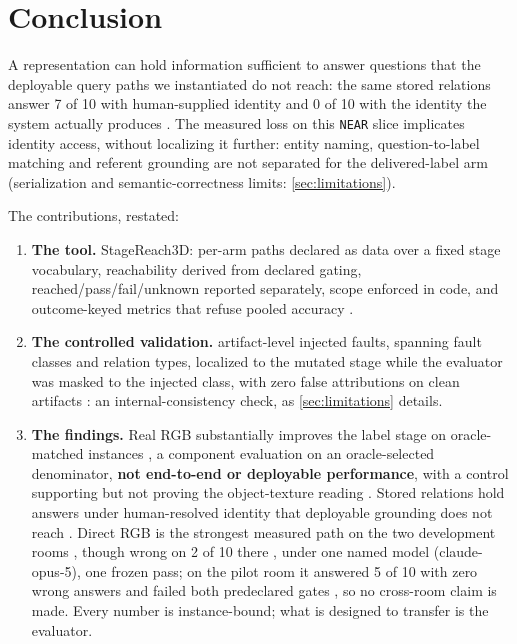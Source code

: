 \section{Conclusion}

A representation can hold information sufficient to answer questions that the deployable
query paths we instantiated do not reach: the same stored relations answer 7 of 10 with
human-supplied identity and 0 of 10 with the identity the system actually produces
. The measured loss on this \texttt{NEAR} slice implicates
identity access, without localizing it further: entity naming, question-to-label
matching and referent grounding are not separated for the delivered-label arm
(serialization and semantic-correctness limits: \cref{sec:limitations}).

The contributions, restated:
\begin{enumerate}\itemsep2pt \parskip0pt
  \item \textbf{The tool.} StageReach3D: per-arm paths declared as data over a fixed
  stage vocabulary, reachability derived from declared gating, reached/pass/fail/unknown
  reported separately, scope enforced in code, and outcome-keyed metrics that refuse
  pooled accuracy .
  \item \textbf{The controlled validation.} \SRFaultLocalized{} artifact-level injected
  faults, spanning \SRFaultClasses{} fault classes and \SRFaultRelationTypes{} relation
  types, localized to the mutated stage while the evaluator was masked to the injected
  class, with zero false attributions on clean artifacts : an
  internal-consistency check, as \cref{sec:limitations} details.
  \item \textbf{The findings.} Real RGB substantially improves the label stage on
  oracle-matched instances , a component evaluation on an
  oracle-selected denominator, \textbf{not end-to-end or deployable performance}, with
  a control supporting but not proving the object-texture reading .
  Stored relations hold answers under human-resolved identity that deployable grounding
  does not reach . Direct RGB is the strongest measured path on the
  two development rooms , though wrong on 2 of 10 there ,
  under one named model (claude-opus-5), one frozen pass; on the pilot room it answered
  5 of 10 with zero wrong answers  and failed both predeclared gates
  , so no cross-room claim is made. Every number is
  instance-bound; what is designed to transfer is the evaluator.\label{endofmaintext}
\end{enumerate}
